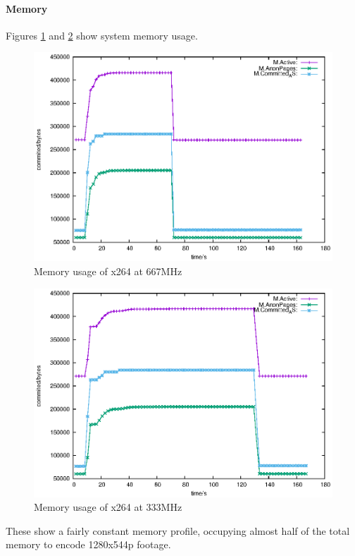 \documentclass[a4paper]{article}
\begin{document}
  \paragraph{Memory}
    Figures \ref{fig:x264:mem:667} and \ref{fig:x264:mem:333} show system memory usage.
    \begin{figure}[p]
      \includegraphics[width=\textwidth]{data/fig/x264:mem:667.eps}
      \caption{Memory usage of x264 at 667MHz}
      \label{fig:x264:mem:667}
    \end{figure}
    \begin{figure}[p]
      \includegraphics[width=\textwidth]{data/fig/x264:mem:333.eps}
      \caption{Memory usage of x264 at 333MHz}
      \label{fig:x264:mem:333}
    \end{figure}
    These show a fairly constant memory profile, occupying almost half of the total memory to encode 1280x544p footage.
\end{document}
